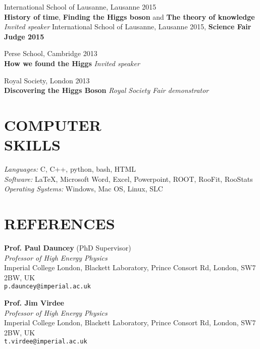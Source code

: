 \documentclass[margin, 10pt]{res} %
\begin{document}
\begin{resume}
International School of Lausanne, Lausanne 2015 \\
\textbf{History of time}, \textbf{Finding the Higgs boson} and \textbf{The theory of knowledge} \\
\textit{Invited speaker}
International School of Lausanne, Lausanne 2015, \textbf{Science Fair Judge 2015}

Perse School, Cambridge 2013 \\
\textbf{How we found the Higgs}
\textit{Invited speaker}

Royal Society, London 2013 \\
\textbf{Discovering the Higgs Boson}
\textit{Royal Society Fair demonstrator}


\section{COMPUTER \\ SKILLS}

{\sl Languages:}
C, C++, python, bash, HTML \\
{\sl Software:}
\LaTeX, Microsoft Word, Excel, Powerpoint, ROOT, RooFit, RooStats \\
{\sl Operating Systems:}
Windows, Mac OS, Linux, SLC


\section{REFERENCES}
\textbf{Prof. Paul Dauncey} (PhD Supervisor) \\
\textit{Professor of High Energy Physics} \\
Imperial College London, Blackett Laboratory, Prince Consort Rd, London, SW7 2BW, UK \\
\texttt{p.dauncey@imperial.ac.uk}

\textbf{Prof. Jim Virdee} \\
\textit{Professor of High Energy Physics} \\
Imperial College London, Blackett Laboratory, Prince Consort Rd, London, SW7 2BW, UK \\
\texttt{t.virdee@imperial.ac.uk}


\end{resume}
\end{document}
